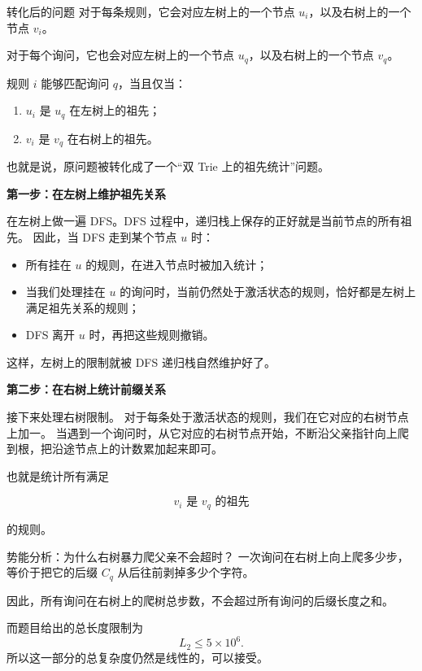 \documentclass{book}
\begin{document}
\begin{keybox}{转化后的问题}
对于每条规则，它会对应左树上的一个节点 $u_i$，以及右树上的一个节点 $v_i$。

对于每个询问，它也会对应左树上的一个节点 $u_q$，以及右树上的一个节点 $v_q$。

规则 $i$ 能够匹配询问 $q$，当且仅当：

\begin{enumerate}[leftmargin=2em,itemsep=1pt,topsep=2pt,parsep=0pt,partopsep=0pt]
    \item $u_i$ 是 $u_q$ 在左树上的祖先；
    \item $v_i$ 是 $v_q$ 在右树上的祖先。
\end{enumerate}

也就是说，原问题被转化成了一个“双 Trie 上的祖先统计”问题。
\end{keybox}

\par\medskip
\noindent\textbf{第一步：在左树上维护祖先关系}
\par\medskip

在左树上做一遍 DFS。DFS 过程中，递归栈上保存的正好就是当前节点的所有祖先。  
因此，当 DFS 走到某个节点 $u$ 时：

\begin{itemize}[leftmargin=2em,itemsep=1pt,topsep=2pt,parsep=0pt,partopsep=0pt]
    \item 所有挂在 $u$ 的规则，在进入节点时被加入统计；
    \item 当我们处理挂在 $u$ 的询问时，当前仍然处于激活状态的规则，恰好都是左树上满足祖先关系的规则；
    \item DFS 离开 $u$ 时，再把这些规则撤销。
\end{itemize}

这样，左树上的限制就被 DFS 递归栈自然维护好了。

 \par\medskip
\noindent\textbf{第二步：在右树上统计前缀关系}
\par\medskip
接下来处理右树限制。  
对于每条处于激活状态的规则，我们在它对应的右树节点上加一。  
当遇到一个询问时，从它对应的右树节点开始，不断沿父亲指针向上爬到根，把沿途节点上的计数累加起来即可。

也就是统计所有满足

\[
v_i \text{ 是 } v_q \text{ 的祖先}
\]

的规则。

\begin{keybox}{势能分析：为什么右树暴力爬父亲不会超时？}
一次询问在右树上向上爬多少步，等价于把它的后缀 $C_q$ 从后往前剥掉多少个字符。

因此，所有询问在右树上的爬树总步数，不会超过所有询问的后缀长度之和。

而题目给出的总长度限制为
\[
L_2\le 5\times 10^6.
\]
所以这一部分的总复杂度仍然是线性的，可以接受。
\end{keybox}
\end{document}
